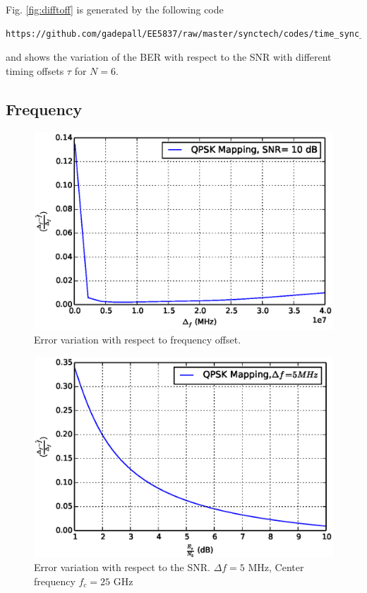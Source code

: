 \documentclass[journal,12pt,twocolumn]{IEEEtran}
\begin{document}
%
Fig. \ref{fig:difftoff} is generated by the following code
\begin{lstlisting}
https://github.com/gadepall/EE5837/raw/master/synctech/codes/time_sync_offsets.py
\end{lstlisting}
and shows the variation of the BER with respect to the SNR  with 
different timing offsets $\tau$ for $N = 6$.
\subsection{Frequency}
\begin{figure}
\begin{center}
\includegraphics[width=\columnwidth]{./figs/frequency_best.eps}
\end{center}
\caption{Error variation with respect to frequency offset.  }
\label{fig:freq_best}
\end{figure}
%
\begin{figure}
\begin{center}
\includegraphics[width=\columnwidth]{./figs/frequencyestiamtion_best_error_vs_snr.eps}
\end{center}
\caption{Error variation with respect to the SNR.  $\Delta f = 5$ MHz, Center frequency $f_c=25$ GHz}
\label{fig:freq_est}
\end{figure}
\end{document}
